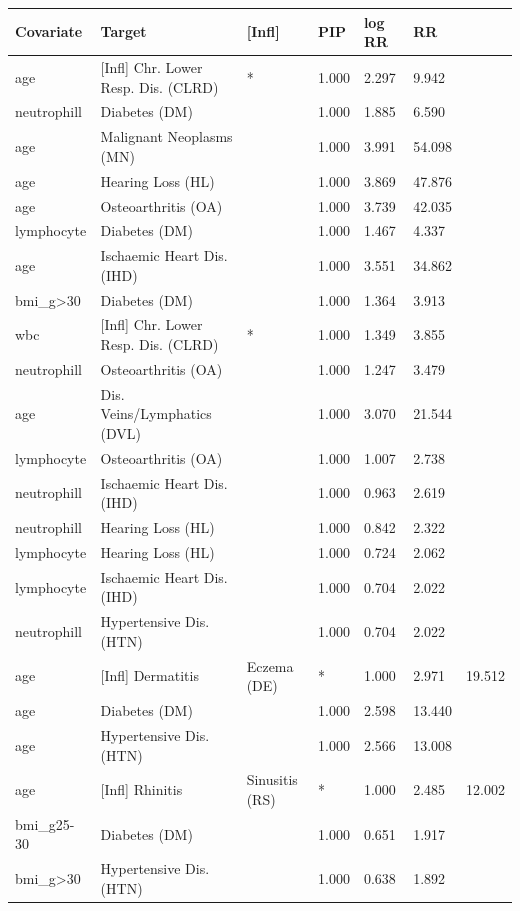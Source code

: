\begin{tabular}{llllll}
  \hline
Covariate & Target & [Infl] & PIP & log RR & RR \\ 
  \hline
age & [Infl] Chr. Lower Resp. Dis. (CLRD) & * & 1.000 & 2.297 & 9.942 \\ 
  neutrophill & Diabetes (DM) &  & 1.000 & 1.885 & 6.590 \\ 
  age & Malignant Neoplasms (MN) &  & 1.000 & 3.991 & 54.098 \\ 
  age & Hearing Loss (HL) &  & 1.000 & 3.869 & 47.876 \\ 
  age & Osteoarthritis (OA) &  & 1.000 & 3.739 & 42.035 \\ 
  lymphocyte & Diabetes (DM) &  & 1.000 & 1.467 & 4.337 \\ 
  age & Ischaemic Heart Dis. (IHD) &  & 1.000 & 3.551 & 34.862 \\ 
  bmi_g>30 & Diabetes (DM) &  & 1.000 & 1.364 & 3.913 \\ 
  wbc & [Infl] Chr. Lower Resp. Dis. (CLRD) & * & 1.000 & 1.349 & 3.855 \\ 
  neutrophill & Osteoarthritis (OA) &  & 1.000 & 1.247 & 3.479 \\ 
  age & Dis. Veins/Lymphatics (DVL) &  & 1.000 & 3.070 & 21.544 \\ 
  lymphocyte & Osteoarthritis (OA) &  & 1.000 & 1.007 & 2.738 \\ 
  neutrophill & Ischaemic Heart Dis. (IHD) &  & 1.000 & 0.963 & 2.619 \\ 
  neutrophill & Hearing Loss (HL) &  & 1.000 & 0.842 & 2.322 \\ 
  lymphocyte & Hearing Loss (HL) &  & 1.000 & 0.724 & 2.062 \\ 
  lymphocyte & Ischaemic Heart Dis. (IHD) &  & 1.000 & 0.704 & 2.022 \\ 
  neutrophill & Hypertensive Dis. (HTN) &  & 1.000 & 0.704 & 2.022 \\ 
  age & [Infl] Dermatitis & Eczema (DE) & * & 1.000 & 2.971 & 19.512 \\ 
  age & Diabetes (DM) &  & 1.000 & 2.598 & 13.440 \\ 
  age & Hypertensive Dis. (HTN) &  & 1.000 & 2.566 & 13.008 \\ 
  age & [Infl] Rhinitis & Sinusitis (RS) & * & 1.000 & 2.485 & 12.002 \\ 
  bmi_g25-30 & Diabetes (DM) &  & 1.000 & 0.651 & 1.917 \\ 
  bmi_g>30 & Hypertensive Dis. (HTN) &  & 1.000 & 0.638 & 1.892 \\ 

\end{tabular}
